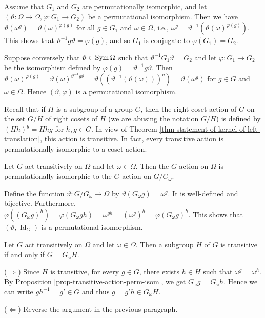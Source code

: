 \begin{sketch}
	Assume that $G_1$ and $G_2$ are permutationally isomorphic, and let $(\vartheta:\Omega\to \Omega, \varphi:G_1\rightarrow G_2)$ be a permutational isomorphism. Then we have $\vartheta(\omega^g) = \vartheta(\omega)^{\varphi(g)}$ for all $g \in G_1$ and $\omega \in \Omega$, i.e., $\omega^g = \vartheta^{-1}(\vartheta(\omega)^{\varphi(g)})$. This shows that $\vartheta^{-1}g\vartheta = \varphi(g)$, and so $G_1$ is conjugate to $\varphi(G_1) = G_2$.
	
	Suppose conversely that $\vartheta \in \operatorname{Sym}\Omega$ such that $\vartheta^{-1}G_1\vartheta = G_2$ and let $\varphi: G_1 \to G_2$ be the isomorphism defined by  $\varphi(g) = \vartheta^{-1}g\vartheta$. Then  $\vartheta(\omega)^{\varphi(g)} = \vartheta(\omega)^{\vartheta^{-1}g\vartheta} = \vartheta((\vartheta^{-1}(\vartheta(\omega)))^{g}) = \vartheta(\omega^g)$ for $g \in G$ and $\omega \in \Omega$. Hence $(\vartheta, \varphi)$ is a permutational isomorphism.
\end{sketch}

 Recall that if $H$ is a subgroup of  a group $G$, then the right coset action of $G$ on the set $G/H$ of right cosets of $H$ (we are abusing the notation $G/H$) is defined by $(Hh)^g  = Hhg$ for $h,g\in G$. In view of Theorem \ref{thm-statement-of-kernel-of-left-translation}, this action is transitive. In fact, every transitive action is permutationally isomorphic to a coset action. 
\begin{proposition} \label{prop-transitive-action-perm-isom}
	Let $G$ act transitively on $\Omega$ and let $\omega\in \Omega$. Then the $G$-action on $\Omega$ is permutationally isomorphic to the $G$-action on $G/G_\omega$.
\end{proposition}
\begin{sketch}
	Define the function $\vartheta: G/G_\omega\to \Omega$ by $\vartheta(G_\omega g) = \omega^g$. It is well-defined and bijective. Furthermore, $\varphi((G_\omega g)^h) = \varphi(G_\omega gh) = \omega^{gh} = (\omega^{g})^h = \varphi(G_\omega g)^h$. This shows that $(\vartheta,\operatorname{Id}_G)$ is a permutational isomorphism.
\end{sketch}

\begin{corollary}
	Let $G$ act transitively on $\Omega$ and let $\omega\in\Omega$. Then a subgroup $H$ of $G$ is transitive if and only if $G = G_\omega H$.
\end{corollary}
\begin{sketch}
	($\Rightarrow$) Since $H$ is transitive, for every $g\in G$, there exists $h\in H$ such that $\omega^g = \omega^h$. By Proposition \ref{prop-transitive-action-perm-isom}, we get $G_\omega g = G_\omega h$. Hence we can write $gh^{-1} = g'\in G$ and thus $g = g'h\in G_\omega H$.
	
	($\Leftarrow$) Reverse the argument in the previous paragraph.
\end{sketch}

